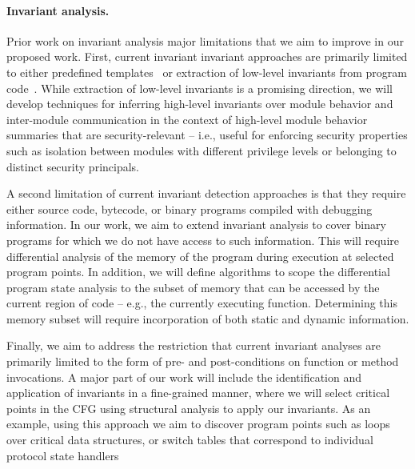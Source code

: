 \documentclass[letterpaper,twoside,11pt,headings=small]{scrartcl}
\begin{document}
\paragraph{Invariant analysis.} Prior work on invariant analysis major
limitations that we aim to improve in our proposed work.  First, current
invariant invariant approaches are primarily limited to either predefined
templates~\cite{ernst:2009:daikon} or extraction of low-level invariants from
program code~\cite{csallner:icse2008:dysy}.  While extraction of low-level
invariants is a promising direction, we will develop techniques for inferring
high-level invariants over module behavior and inter-module communication in
the context of high-level module behavior summaries that are security-relevant
-- i.e., useful for enforcing security properties such as isolation between
   modules with different privilege levels or belonging to distinct security
   principals.

A second limitation of current invariant detection approaches is that they
require either source code, bytecode, or binary programs compiled with
debugging information.  In our work, we aim to extend invariant analysis to
cover binary programs for which we do not have access to such information.
This will require differential analysis of the memory of the program during
execution at selected program points.  In addition, we will define algorithms
to scope the differential program state analysis to the subset of memory that
can be accessed by the current region of code -- e.g., the currently executing
function.  Determining this memory subset will require incorporation of both
static and dynamic information.

Finally, we aim to address the restriction that current invariant analyses are
primarily limited to the form of pre- and post-conditions on function or
method invocations.  A major part of our work will include the identification
and application of invariants in a fine-grained manner, where we will select
critical points in the CFG using structural analysis to apply our invariants.
As an example, using this approach we aim to discover program points such as
loops over critical data structures, or switch tables that correspond to
individual protocol state handlers
\end{document}
